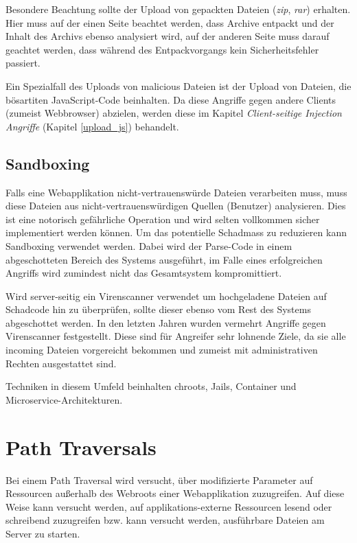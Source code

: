 Besondere Beachtung sollte der Upload von gepackten Dateien (\textit{zip}, \textit{rar}) erhalten. Hier muss auf der einen Seite beachtet werden, dass Archive entpackt und der Inhalt des Archivs ebenso analysiert wird, auf der anderen Seite muss darauf geachtet werden, dass während des Entpackvorgangs kein Sicherheitsfehler passiert.

Ein Spezialfall des Uploads von malicious Dateien ist der Upload von Dateien, die bösartiten JavaScript-Code beinhalten. Da diese Angriffe gegen andere Clients (zumeist Webbrowser) abzielen, werden diese im Kapitel \textit{Client-seitige Injection Angriffe} (Kapitel \ref{upload_js}) behandelt.

\subsection{Sandboxing}

Falls eine Webapplikation nicht-vertrauenswürde Dateien verarbeiten muss, muss diese Dateien aus nicht-vertrauenswürdigen Quellen (Benutzer) analysieren. Dies ist eine notorisch gefährliche Operation und wird selten vollkommen sicher implementiert werden können. Um das potentielle Schadmass zu reduzieren kann Sandboxing verwendet werden. Dabei wird der Parse-Code in einem abgeschotteten Bereich des Systems ausgeführt, im Falle eines erfolgreichen Angriffs wird zumindest nicht das Gesamtsystem kompromittiert.

Wird server-seitig ein Virenscanner verwendet um hochgeladene Dateien auf Schadcode hin zu überprüfen, sollte dieser ebenso vom Rest des Systems abgeschottet werden. In den letzten Jahren wurden vermehrt Angriffe gegen Virenscanner festgestellt. Diese sind für Angreifer sehr lohnende Ziele, da sie alle incoming Dateien vorgereicht bekommen und zumeist mit administrativen Rechten ausgestattet sind.

Techniken in diesem Umfeld beinhalten chroots, Jails, Container und Microservice-Architekturen.

\section{Path Traversals}

Bei einem Path Traversal wird versucht, über modifizierte Parameter auf Ressourcen außerhalb des Webroots einer Webapplikation zuzugreifen. Auf diese Weise kann versucht werden, auf applikations-externe Ressourcen lesend oder schreibend zuzugreifen bzw. kann versucht werden, ausführbare Dateien am Server zu starten.

